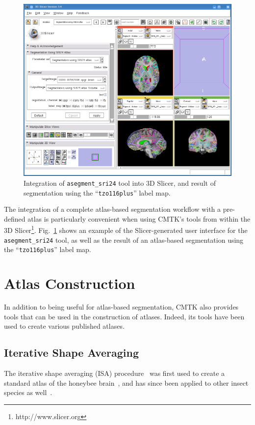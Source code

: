 \documentclass{InsightArticle}
\begin{document}
\begin{figure}[tb]
\centerline{\includegraphics[width=\linewidth]{img/slicer-asegment_sri24}}
\caption{Integration of {\tt asegment\_sri24} tool into 3D Slicer, and result
  of segmentation using the ``{\tt tzo116plus}'' label map.}
\label{fig:SlicerSRI24}
\end{figure}

The integration of a complete atlas-based segmentation workflow with a
pre-defined atlas is particularly convenient when using CMTK's tools from
within the 3D
Slicer\footnote{http://www.slicer.org}. Fig.~\ref{fig:SlicerSRI24} shows an
example of the Slicer-generated user interface for the \verb|asegment_sri24|
tool, as well as the result of an atlas-based segmentation using the
``\verb|tzo116plus|'' label map.

\clearpage
\section{Atlas Construction}

In addition to being useful for atlas-based segmentation, CMTK also provides
tools that can be used in the construction of atlases. Indeed, its tools have
been used to create various published atlases.

\subsection{Iterative Shape Averaging}

The iterative shape averaging (ISA) procedure~\cite{RohlBranMaur:2001} was
first used to create a standard atlas of the honeybee
brain~\cite{BranRohlRyba:2005}, and has since been applied to other insect
species as well~\cite{KuryRohlKrof:2008,KvelLofaRyba:2009}.
\end{document}
